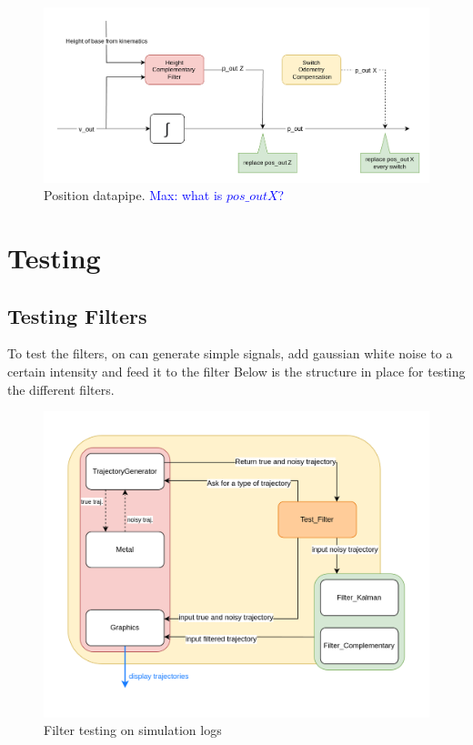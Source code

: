\documentclass[a4paper,10pt]{article}
\newcommand{\mnaveau}[1]{\textcolor{blue}{Max: #1}}
\begin{document}
\begin{figure}[H]
\centering
  \includegraphics[width=\linewidth, angle=0, scale=1]{./images/Variable_Position.png}
  \caption{Position datapipe. \mnaveau{what is $pos\_outX$?}}
\end{figure}






\section{Testing}
\subsection{Testing Filters}
To test the filters, on can generate simple signals, add gaussian white noise to a certain intensity and feed it to the filter
Below is the structure in place for testing the different filters.
\begin{figure}[H]
\centering
  \includegraphics[width=\linewidth, angle=0, scale=1]{./images/Action_Test.png}
  \caption{Filter testing on simulation logs}
\end{figure}
\end{document}
